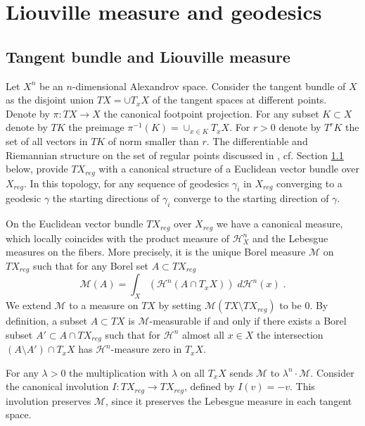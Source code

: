 \documentclass[12pt,leqno]{amsart}
\numberwithin{equation}{section}
\theoremstyle{definition}
\theoremstyle{remark}
\begin{document}
\section{Liouville measure and geodesics}
\subsection{Tangent bundle and Liouville measure}
Let $X^n$ be an $n$-dimensional Alexandrov space. Consider the tangent bundle of $X$
  as the  disjoint union $TX=\cup T_x X$ of the tangent spaces at different points. Denote by $\pi:TX\to X$ the canonical footpoint projection.
	For any subset $K\subset X$ denote by $TK$ the preimage $\pi^{-1} (K)= \cup _{x\in K} T_xX$. For $r>0$ denote by $T^r K$ the set of all vectors in $TK$
	of norm smaller than $r$.
 The   differentiable and Riemannian structure on the set of regular points discussed in \cite{Otsu}, cf. Section \ref{} below,  provide  $TX_{reg}$ with a canonical structure of a Euclidean vector bundle over $X_{reg}$. In this topology, for any sequence of geodesics $\gamma _i$ in $X_{reg}$ converging to a geodesic $\gamma$ the starting directions of $\gamma _i$ converge to the starting direction of $\gamma$.

 On the Euclidean vector bundle $TX_{reg}$ over $X_{reg}$ we have a canonical measure, which locally coincides with the product measure of $\mathcal H^n _X$ and the Lebesgue measures on the fibers. More precisely,
 it is the unique Borel measure $\mathcal M$ on $TX_{reg}$ such that for any  Borel set $A\subset TX_{reg}$
 $$\mathcal M(A)= \int _X (\mathcal H^n(A \cap T_x X)) \; d\mathcal H^n (x) \; .$$
 We extend $\mathcal M$ to a measure on $TX$ by setting $\mathcal M(TX\setminus TX_{reg})$ to be $0$.
By definition, a subset $A\subset TX$ is $\mathcal M$-measurable if and only if there exists  a Borel subset $A'\subset A\cap TX_{reg}$ such that
for $\mathcal H^n$ almost all $x\in X$ the intersection $(A\setminus A') \cap T_xX$ has $\mathcal H^n$-measure zero in $T_xX$.




 For any $\lambda >0$ the multiplication with $\lambda$  on all $T_xX$ sends $\mathcal M $ to $\lambda ^n \cdot \mathcal M$.
 Consider the canonical involution $I:TX_{reg}\to TX_{reg}$, defined by $I(v)=-v$.
This involution preserves $\mathcal M$, since it preserves the Lebesgue measure in each tangent space.
\end{document}
